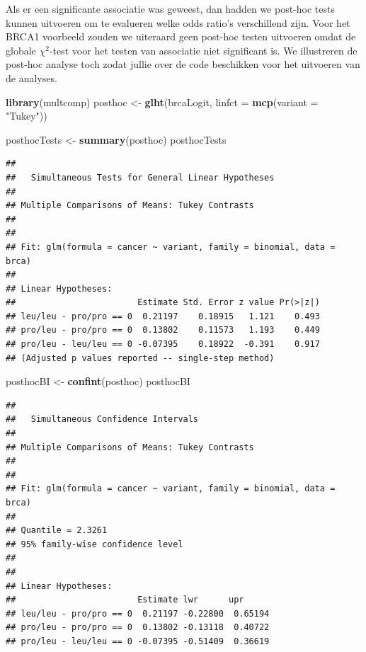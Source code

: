 \documentclass[
  12pt,dutch]{book}
\newenvironment{Shaded}{\begin{snugshade}}{\end{snugshade}}
\newcommand{\AttributeTok}[1]{\textcolor[rgb]{0.13,0.29,0.53}{#1}}
\newcommand{\FunctionTok}[1]{\textcolor[rgb]{0.13,0.29,0.53}{\textbf{#1}}}
\newcommand{\NormalTok}[1]{#1}
\newcommand{\OtherTok}[1]{\textcolor[rgb]{0.56,0.35,0.01}{#1}}
\newcommand{\StringTok}[1]{\textcolor[rgb]{0.31,0.60,0.02}{#1}}
\theoremstyle{definition}
\theoremstyle{definition}
\theoremstyle{definition}
\theoremstyle{definition}
\theoremstyle{remark}
\begin{document}
Als er een significante associatie was geweest, dan hadden we post-hoc tests kunnen uitvoeren om te evalueren welke odds ratio's verschillend zijn.
Voor het BRCA1 voorbeeld zouden we uiteraard geen post-hoc testen uitvoeren omdat de globale \(\chi^2\)-test voor het testen van associatie niet significant is.
We illustreren de post-hoc analyse toch zodat jullie over de code beschikken voor het uitvoeren van de analyses.

\begin{Shaded}
\begin{Highlighting}[]
\FunctionTok{library}\NormalTok{(multcomp)}
\NormalTok{posthoc }\OtherTok{\textless{}{-}} \FunctionTok{glht}\NormalTok{(brcaLogit, }\AttributeTok{linfct =} \FunctionTok{mcp}\NormalTok{(}\AttributeTok{variant =} \StringTok{"Tukey"}\NormalTok{))}

\NormalTok{posthocTests }\OtherTok{\textless{}{-}} \FunctionTok{summary}\NormalTok{(posthoc)}
\NormalTok{posthocTests}
\end{Highlighting}
\end{Shaded}

\begin{verbatim}
## 
##   Simultaneous Tests for General Linear Hypotheses
## 
## Multiple Comparisons of Means: Tukey Contrasts
## 
## 
## Fit: glm(formula = cancer ~ variant, family = binomial, data = brca)
## 
## Linear Hypotheses:
##                        Estimate Std. Error z value Pr(>|z|)
## leu/leu - pro/pro == 0  0.21197    0.18915   1.121    0.493
## pro/leu - pro/pro == 0  0.13802    0.11573   1.193    0.449
## pro/leu - leu/leu == 0 -0.07395    0.18922  -0.391    0.917
## (Adjusted p values reported -- single-step method)
\end{verbatim}

\begin{Shaded}
\begin{Highlighting}[]
\NormalTok{posthocBI }\OtherTok{\textless{}{-}} \FunctionTok{confint}\NormalTok{(posthoc)}
\NormalTok{posthocBI}
\end{Highlighting}
\end{Shaded}

\begin{verbatim}
## 
##   Simultaneous Confidence Intervals
## 
## Multiple Comparisons of Means: Tukey Contrasts
## 
## 
## Fit: glm(formula = cancer ~ variant, family = binomial, data = brca)
## 
## Quantile = 2.3261
## 95% family-wise confidence level
##  
## 
## Linear Hypotheses:
##                        Estimate lwr      upr     
## leu/leu - pro/pro == 0  0.21197 -0.22800  0.65194
## pro/leu - pro/pro == 0  0.13802 -0.13118  0.40722
## pro/leu - leu/leu == 0 -0.07395 -0.51409  0.36619
\end{verbatim}
\end{document}

